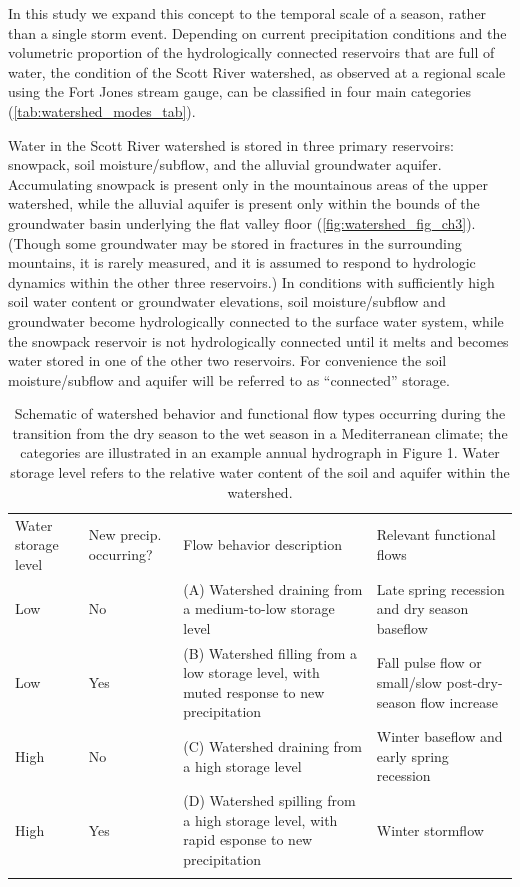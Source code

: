 \documentclass[hess, manuscript]{copernicus}
\begin{document}
In this study we expand this concept to the temporal scale of a season,
rather than a single storm event. Depending on current precipitation
conditions and the volumetric proportion of the hydrologically connected
reservoirs that are full of water, the condition of the Scott River
watershed, as observed at a regional scale using the Fort Jones stream
gauge, can be classified in four main categories
(\autoref{tab:watershed_modes_tab}).

Water in the Scott River watershed is stored in three primary
reservoirs: snowpack, soil moisture/subflow, and the alluvial
groundwater aquifer. Accumulating snowpack is present only in the
mountainous areas of the upper watershed, while the alluvial aquifer is
present only within the bounds of the groundwater basin underlying the
flat valley floor (\autoref{fig:watershed_fig_ch3}). (Though some
groundwater may be stored in fractures in the surrounding mountains, it
is rarely measured, and it is assumed to respond to hydrologic dynamics
within the other three reservoirs.) In conditions with sufficiently high
soil water content or groundwater elevations, soil moisture/subflow and
groundwater become hydrologically connected to the surface water system,
while the snowpack reservoir is not hydrologically connected until it
melts and becomes water stored in one of the other two reservoirs. For
convenience the soil moisture/subflow and aquifer will be referred to as
``connected'' storage.

\begin{table}[t]
\caption{Schematic of watershed behavior and functional flow types occurring during the transition from the dry season to the wet season in a Mediterranean climate; the categories are illustrated in an example annual hydrograph in Figure 1. Water storage level refers to the relative water content of the soil and aquifer within the watershed.}
\label{tab:watershed_modes_tab}
\begin{tabular}{p{1.8cm} p{1.6cm} p{4.8cm} p{5cm}}
\tophline
Water storage level & New precip. occurring? & Flow behavior description & Relevant functional flows \\
\middlehline
 Low & No & (A) Watershed draining from a medium-to-low storage level & Late spring recession and dry season baseflow \\ 
 \middlehline
Low & Yes & (B) Watershed filling from a low storage level, with muted response to new precipitation & Fall pulse flow or small/slow post-dry-season flow increase \\
\middlehline
High & No & (C) Watershed draining from a high storage level & Winter baseflow and early spring recession \\
\middlehline
High & Yes & (D) Watershed spilling from a high storage level, with rapid esponse to new precipitation & Winter stormflow\\
\bottomhline
\end{tabular}
\belowtable{}
\end{table}
\end{document}
